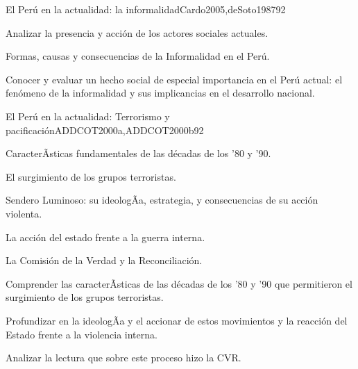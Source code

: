 \begin{syllabus}
\begin{unit}{El Perú en la actualidad: la informalidad}{Cardo2005,deSoto1987}{9}{2}
\begin{topics}
      \item Analizar la presencia y acción de los actores sociales actuales.
      \item Formas, causas y consecuencias de la Informalidad en el Perú.
\end{topics}

\begin{unitgoals}
      \item Conocer y evaluar un hecho social de especial importancia en el Perú actual: el fenómeno de la informalidad y sus implicancias en el desarrollo nacional.
\end{unitgoals}
\end{unit}

\begin{unit}{El Perú en la actualidad: Terrorismo y pacificación}{ADDCOT2000a,ADDCOT2000b}{9}{2}
\begin{topics}
      \item CaracterÃ­sticas fundamentales de las décadas de los '80 y '90.
      \item El surgimiento de los grupos terroristas.
      \item Sendero Luminoso: su ideologÃ­a, estrategia, y consecuencias de su acción violenta.
      \item La acción del estado frente a la guerra interna.
      \item La Comisión de la Verdad y la Reconciliación.
\end{topics}
\begin{unitgoals}
      \item Comprender las caracterÃ­sticas de las décadas de los '80 y '90 que permitieron el surgimiento de los grupos terroristas.
      \item Profundizar en la ideologÃ­a y el accionar de estos movimientos y la reacción del Estado frente a la violencia interna.
      \item Analizar la lectura que sobre este proceso hizo la CVR.
\end{unitgoals}
\end{unit}

\begin{coursebibliography}
\end{coursebibliography}

\end{syllabus}

%

